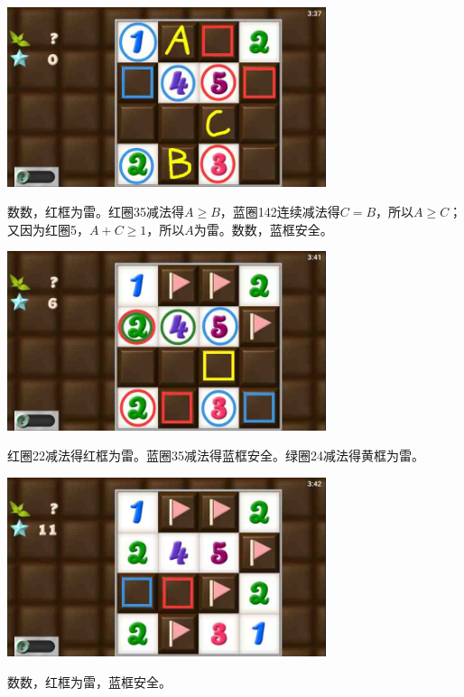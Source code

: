 \subsection{} %
\begin{center}
    \includegraphics[width=0.7\textwidth]{puzzlelow/160-1.jpg}
\end{center}
数数，红框为雷。红圈35减法得$A\ge B$，蓝圈142连续减法得$C=B$，所以$A\ge C$；又因为红圈5，$A+C\ge 1$，所以$A$为雷。数数，蓝框安全。
\begin{center}
    \includegraphics[width=0.7\textwidth]{puzzlelow/160-2.jpg}
\end{center}
红圈22减法得红框为雷。蓝圈35减法得蓝框安全。绿圈24减法得黄框为雷。
\begin{center}
    \includegraphics[width=0.7\textwidth]{puzzlelow/160-3.jpg}
\end{center}
数数，红框为雷，蓝框安全。

